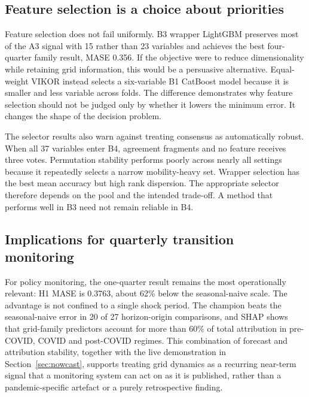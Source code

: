 \documentclass[preprint,12pt]{elsarticle}
\begin{document}
\subsection{Feature selection is a choice about priorities}

Feature selection does not fail uniformly. B3 wrapper LightGBM preserves most of the A3 signal with 15 rather than 23 variables and achieves the best four-quarter family result, MASE 0.356. If the objective were to reduce dimensionality while retaining grid information, this would be a persuasive alternative. Equal-weight VIKOR instead selects a six-variable B1 CatBoost model because it is smaller and less variable across folds. The difference demonstrates why feature selection should not be judged only by whether it lowers the minimum error. It changes the shape of the decision problem.

The selector results also warn against treating consensus as automatically robust. When all 37 variables enter B4, agreement fragments and no feature receives three votes. Permutation stability performs poorly across nearly all settings because it repeatedly selects a narrow mobility-heavy set. Wrapper selection has the best mean accuracy but high rank dispersion. The appropriate selector therefore depends on the pool and the intended trade-off. A method that performs well in B3 need not remain reliable in B4.

\subsection{Implications for quarterly transition monitoring}\label{sec:monitoring}

For policy monitoring, the one-quarter result remains the most operationally relevant: H1 MASE is 0.3763, about 62\% below the seasonal-naive scale. The advantage is not confined to a single shock period. The champion beats the seasonal-naive error in 20 of 27 horizon-origin comparisons, and SHAP shows that grid-family predictors account for more than 60\% of total attribution in pre-COVID, COVID and post-COVID regimes. This combination of forecast and attribution stability, together with the live demonstration in Section~\ref{sec:nowcast}, supports treating grid dynamics as a recurring near-term signal that a monitoring system can act on as it is published, rather than a pandemic-specific artefact or a purely retrospective finding.
\end{document}
